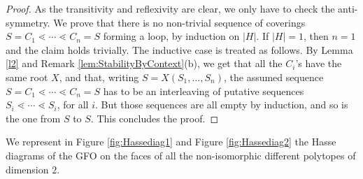 \documentclass{article}
\theoremstyle{plain}
\theoremstyle{definition}
\begin{document}
\begin{proof}
 As the transitivity and reflexivity are clear, we only have to check the anti-symmetry. 
We prove that there is no non-trivial sequence of coverings $S=C_1\lessdot \cdots \lessdot C_n =S$ forming a loop, by induction on $|H|$. 
 If $|H|=1$, then $n=1$ and the claim holds trivially. The inductive case is treated as follows. By Lemma \ref{l2} and Remark \ref{lem:StabilityByContext}(b), we get that all the
$C_i$'s have the same root $X$, and that, writing $S=X(S_1,\ldots,S_n)$, the assumed sequence 
 $S=C_1\lessdot \cdots \lessdot C_n =S$ has to be an interleaving of putative sequences 
 $S_i\lessdot \cdots \lessdot S_i$, for all $i$. But those sequences are all empty by induction, and so is the one from $S$ to $S$. This concludes the proof.
\end{proof}
We represent in Figure \ref{fig:Hassediag1} and Figure \ref{fig:Hassediag2} the Hasse diagrams of the GFO on the faces of all the non-isomorphic different polytopes of dimension $2$. 
\end{document}
